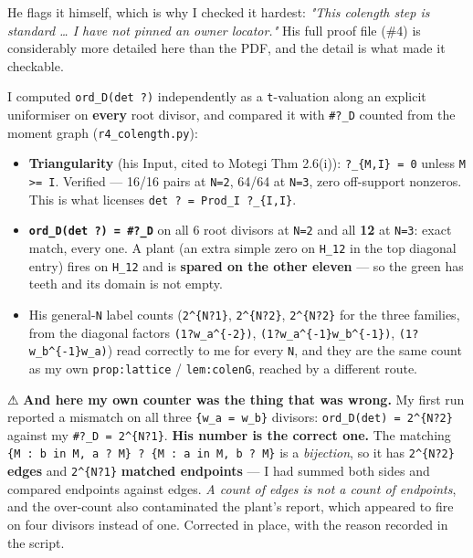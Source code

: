\documentclass[11pt,a4paper]{article}
\begin{document}
He flags it himself, which is why I checked it hardest: \emph{"This colength step is standard \dots{} I have not pinned an owner locator."} His full proof file (\#4) is considerably more detailed here than the PDF, and the detail is what made it checkable.

I computed \mbox{\texttt{ord\_D(det ?)}} independently as a \mbox{\texttt{t}}-valuation along an explicit uniformiser on \textbf{every} root divisor, and compared it with \mbox{\texttt{\#?\_D}} counted from the moment graph (\mbox{\texttt{r4\_colength.py}}):

\begin{itemize}
\item \textbf{Triangularity} (his Input, cited to Motegi Thm 2.6(i)): \mbox{\texttt{?\_\{M,I\} = 0}} unless \mbox{\texttt{M >= I}}. Verified --- 16/16 pairs at \mbox{\texttt{N=2}}, 64/64 at \mbox{\texttt{N=3}}, zero off-support nonzeros. This is what licenses \mbox{\texttt{det ? = Prod\_I ?\_\{I,I\}}}.
\item \textbf{\mbox{\texttt{ord\_D(det ?) = \#?\_D}}} on all 6 root divisors at \mbox{\texttt{N=2}} and all \textbf{12} at \mbox{\texttt{N=3}}: exact match, every one. A plant (an extra simple zero on \mbox{\texttt{H\_12}} in the top diagonal entry) fires on \mbox{\texttt{H\_12}} and is \textbf{spared on the other eleven} --- so the green has teeth and its domain is not empty.
\item His general-\mbox{\texttt{N}} label counts (\mbox{\texttt{2\textasciicircum{}\{N?1\}}}, \mbox{\texttt{2\textasciicircum{}\{N?2\}}}, \mbox{\texttt{2\textasciicircum{}\{N?2\}}} for the three families, from the diagonal factors \mbox{\texttt{(1?w\_a\textasciicircum{}\{-2\})}}, \mbox{\texttt{(1?w\_a\textasciicircum{}\{-1\}w\_b\textasciicircum{}\{-1\})}}, \mbox{\texttt{(1?w\_b\textasciicircum{}\{-1\}w\_a)}}) read correctly to me for every \mbox{\texttt{N}}, and they are the same count as my own \mbox{\texttt{prop:lattice}} / \mbox{\texttt{lem:colenG}}, reached by a different route.
\end{itemize}

⚠ \textbf{And here my own counter was the thing that was wrong.} My first run reported a mismatch on all three \mbox{\texttt{\{w\_a = w\_b\}}} divisors: \mbox{\texttt{ord\_D(det) = 2\textasciicircum{}\{N?2\}}} against my \mbox{\texttt{\#?\_D = 2\textasciicircum{}\{N?1\}}}. \textbf{His number is the correct one.} The matching \mbox{\texttt{\{M : b in M, a ? M\} ? \{M : a in M, b ? M\}}} is a \emph{bijection}, so it has \mbox{\texttt{2\textasciicircum{}\{N?2\}}} \textbf{edges} and \mbox{\texttt{2\textasciicircum{}\{N?1\}}} \textbf{matched endpoints} --- I had summed both sides and compared endpoints against edges. \emph{A count of edges is not a count of endpoints}, and the over-count also contaminated the plant's report, which appeared to fire on four divisors instead of one. Corrected in place, with the reason recorded in the script.
\end{document}
